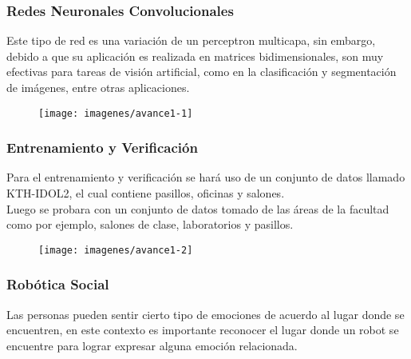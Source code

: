 \documentclass[12pt]{beamer}
\begin{document}
\begin{frame}
\frametitle{Redes Neuronales Convolucionales}

Este tipo de red es una variación de un perceptron multicapa, sin embargo, debido a que su aplicación es realizada en matrices bidimensionales, son muy efectivas para tareas de visión artificial, como en la clasificación y segmentación de imágenes, entre otras aplicaciones.

\begin{figure}
	\centering
	\texttt{[image: imagenes/avance1-1]}
\end{figure}

\end{frame}

\begin{frame}
\frametitle{Entrenamiento y Verificación}

Para el entrenamiento y verificación se hará uso de un conjunto de datos llamado KTH-IDOL2, el cual contiene pasillos, oficinas y salones. \\

Luego se probara con un conjunto de datos tomado de las áreas de la facultad como por ejemplo, salones de clase, laboratorios y pasillos.

\begin{figure}
	\centering
	\texttt{[image: imagenes/avance1-2]}
\end{figure}


\end{frame}


\begin{frame}
\frametitle{Robótica Social }

Las personas pueden sentir cierto tipo de emociones de acuerdo al lugar donde se encuentren, en este contexto es importante reconocer el lugar donde un robot se encuentre para lograr expresar alguna emoción relacionada.

\end{frame}
\end{document}
